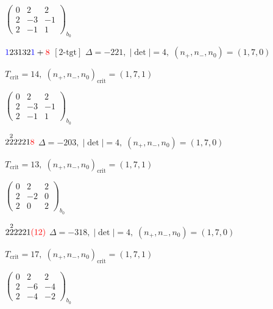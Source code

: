 \documentclass[10pt]{article}
\begin{document}
\hspace{2em}$\left(\begin{smallmatrix}0 & 2 & 2 \\ 2 & -3 & -1 \\ 2 & -1 & 1\end{smallmatrix}\right)_{\!b_0}$

\smallskip

$\textcolor{blue}{1}23132\textcolor{blue}{1}+\textcolor{red}{8}$ $\scriptstyle [2\text{-tgt}]$ \quad $\Delta=-221,\; |\det|=4,\; (n_+,n_-,n_0)=(1,7,0)$

\hspace{1em}$T_{\text{crit}}=14,\; (n_+,n_-,n_0)_{\text{crit}}=(1,7,1)$

\hspace{2em}$\left(\begin{smallmatrix}0 & 2 & 2 \\ 2 & -3 & -1 \\ 2 & -1 & 1\end{smallmatrix}\right)_{\!b_0}$

\smallskip

$2\overset{2}{2}2221\textcolor{red}{8}$ \quad $\Delta=-203,\; |\det|=4,\; (n_+,n_-,n_0)=(1,7,0)$

\hspace{1em}$T_{\text{crit}}=13,\; (n_+,n_-,n_0)_{\text{crit}}=(1,7,1)$

\hspace{2em}$\left(\begin{smallmatrix}0 & 2 & 2 \\ 2 & -2 & 0 \\ 2 & 0 & 2\end{smallmatrix}\right)_{\!b_0}$

$2\overset{2}{2}2221\textcolor{red}{(12)}$ \quad $\Delta=-318,\; |\det|=4,\; (n_+,n_-,n_0)=(1,7,0)$

\hspace{1em}$T_{\text{crit}}=17,\; (n_+,n_-,n_0)_{\text{crit}}=(1,7,1)$

\hspace{2em}$\left(\begin{smallmatrix}0 & 2 & 2 \\ 2 & -6 & -4 \\ 2 & -4 & -2\end{smallmatrix}\right)_{\!b_0}$

\smallskip
\end{document}

